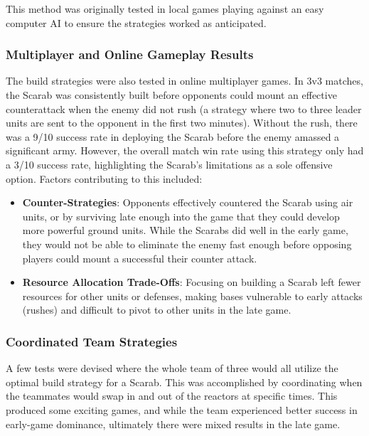 \documentclass[a4paper, 12pt, english]{article}
\begin{document}
This method was originally tested in local games playing against an easy computer AI to ensure the strategies worked as anticipated.
\newline

\subsubsection{Multiplayer and Online Gameplay Results}
The build strategies were also tested in online multiplayer games. In 3v3 matches, the Scarab was consistently built before opponents could mount an effective counterattack when the enemy did not rush (a strategy where two to three leader units are sent to the opponent in the first two minutes). Without the rush, there was a 9/10 success rate in deploying the Scarab before the enemy amassed a significant army. However, the overall match win rate using this strategy only had a 3/10 success rate, highlighting the Scarab's limitations as a sole offensive option. Factors contributing to this included:
    \begin{itemize}
    \item \textbf{Counter-Strategies}: Opponents effectively countered the Scarab using air units, or by surviving late enough into the game that they could develop more powerful ground units. While the Scarabs did well in the early game, they would not be able to eliminate the enemy fast enough before opposing players could mount a successful their counter attack.
    \item \textbf{Resource Allocation Trade-Offs}:  Focusing on building a Scarab left fewer resources for other units or defenses, making bases vulnerable to early attacks (rushes) and difficult to pivot to other units in the late game.
    \end{itemize}

\subsubsection{Coordinated Team Strategies}
A few tests were devised where the whole team of three would all utilize the optimal build strategy for a Scarab. This was accomplished by coordinating when the teammates would swap in and out of the reactors at specific times. This produced some exciting games, and while the team experienced better success in early-game dominance, ultimately there were mixed results in the late game.
\newline
\end{document}
